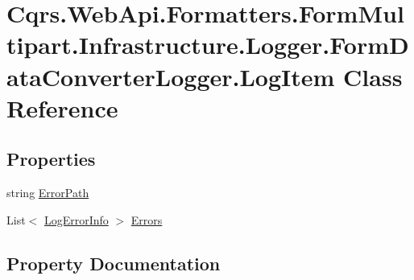 \hypertarget{classCqrs_1_1WebApi_1_1Formatters_1_1FormMultipart_1_1Infrastructure_1_1Logger_1_1FormDataConverterLogger_1_1LogItem}{}\section{Cqrs.\+Web\+Api.\+Formatters.\+Form\+Multipart.\+Infrastructure.\+Logger.\+Form\+Data\+Converter\+Logger.\+Log\+Item Class Reference}
\label{classCqrs_1_1WebApi_1_1Formatters_1_1FormMultipart_1_1Infrastructure_1_1Logger_1_1FormDataConverterLogger_1_1LogItem}
\subsection*{Properties}
\begin{DoxyCompactItemize}
\item 
string \hyperlink{classCqrs_1_1WebApi_1_1Formatters_1_1FormMultipart_1_1Infrastructure_1_1Logger_1_1FormDataConverterLogger_1_1LogItem_a300199a6b543a7a53b81b18aeb10652b}{Error\+Path}
\item 
List$<$ \hyperlink{classCqrs_1_1WebApi_1_1Formatters_1_1FormMultipart_1_1Infrastructure_1_1Logger_1_1FormDataConverterLogger_1_1LogErrorInfo}{Log\+Error\+Info} $>$ \hyperlink{classCqrs_1_1WebApi_1_1Formatters_1_1FormMultipart_1_1Infrastructure_1_1Logger_1_1FormDataConverterLogger_1_1LogItem_ae02eb8b73e2614a9f24eb87bfaa6c23f}{Errors}
\end{DoxyCompactItemize}


\subsection{Property Documentation}
\mbox{\label{classCqrs_1_1WebApi_1_1Formatters_1_1FormMultipart_1_1Infrastructure_1_1Logger_1_1FormDataConverterLogger_1_1LogItem_a300199a6b543a7a53b81b18aeb10652b}} 
